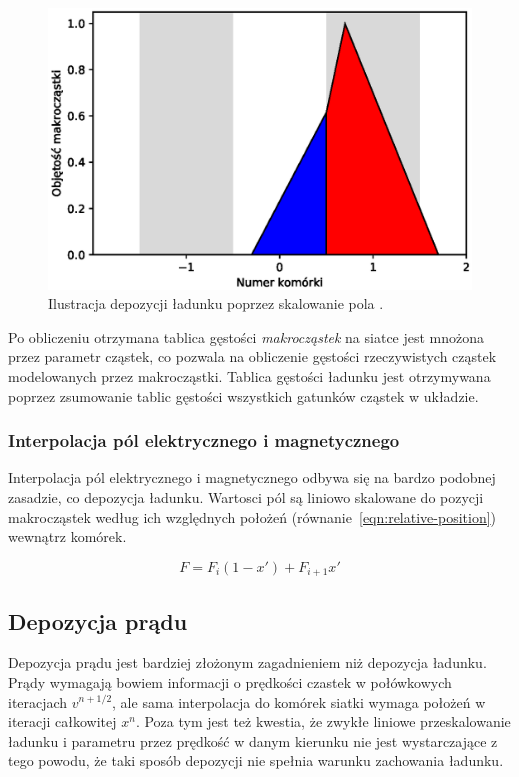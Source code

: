 \begin{figure}[h!]
  \includegraphics[width=\textwidth]{Images/charge-deposition}
  \caption{Ilustracja depozycji ładunku poprzez skalowanie pola .\label{fig:charge-deposition}}
\end{figure} %

Po obliczeniu otrzymana tablica gęstości \emph{makrocząstek} na
siatce jest mnożona przez parametr  cząstek, co pozwala na
obliczenie gęstości rzeczywistych cząstek modelowanych przez makrocząstki.
Tablica gęstości ładunku jest otrzymywana poprzez zsumowanie tablic gęstości
wszystkich gatunków cząstek w układzie.

\subsubsection{Interpolacja pól elektrycznego i magnetycznego}

Interpolacja pól elektrycznego i magnetycznego odbywa się na bardzo podobnej
zasadzie, co depozycja ładunku. Wartosci pól są liniowo skalowane do pozycji
makrocząstek według ich względnych położeń (równanie~\ref{eqn:relative-position}) wewnątrz komórek.

\begin{equation}
    F = F_i (1-x') + F_{i+1} x'
    \label{eqn:field-interpolation}
\end{equation}

\subsection{Depozycja prądu} %

Depozycja prądu jest bardziej złożonym zagadnieniem niż depozycja ładunku.
Prądy wymagają bowiem informacji o prędkości czastek w połówkowych
iteracjach $v^{n+1/2}$, ale sama interpolacja do komórek siatki wymaga
położeń w iteracji całkowitej $x^{n}$. Poza tym jest też kwestia, że zwykłe
liniowe przeskalowanie ładunku i parametru  przez prędkość w
danym kierunku nie jest wystarczające z tego powodu, że taki sposób
depozycji nie spełnia warunku zachowania ładunku.


